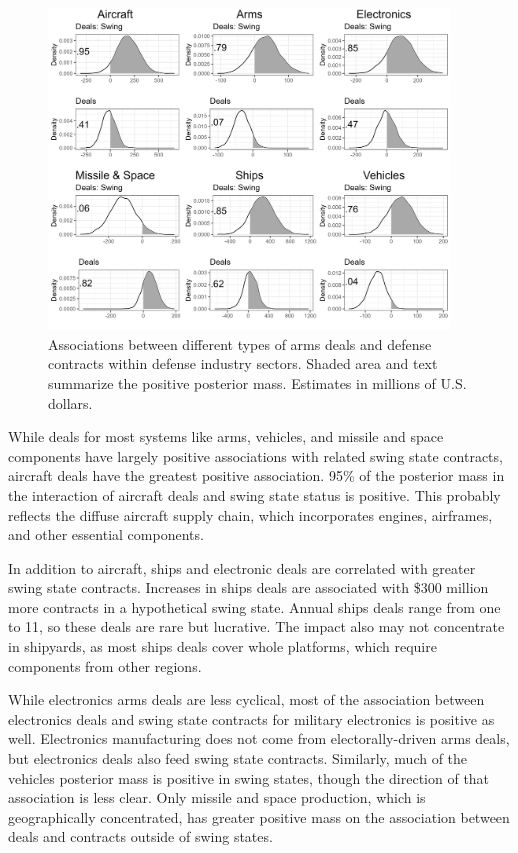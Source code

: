 \documentclass[12pt]{article}
\begin{document}
\begin{figure}[htpb]
	\centering
		\includegraphics[width=0.95\textwidth]{../figures/me-deals-sector.png}
	\caption{Associations between different types of arms deals and defense contracts within defense industry sectors. Shaded area and text summarize the positive posterior mass. Estimates in millions of U.S. dollars.}
	\label{fig:me-deals-sector}
\end{figure}


While deals for most systems like arms, vehicles, and missile and space components have largely positive associations with related swing state contracts, aircraft deals have the greatest positive association. 
95\% of the posterior mass in the interaction of aircraft deals and swing state status is positive.
This probably reflects the diffuse aircraft supply chain, which incorporates engines, airframes, and other essential components. 


In addition to aircraft, ships and electronic deals are correlated with greater swing state contracts. 
Increases in ships deals are associated with \$300 million more contracts in a hypothetical swing state. 
Annual ships deals range from one to 11, so these deals are rare but lucrative. 
The impact also may not concentrate in shipyards, as most ships deals cover whole platforms, which require components from other regions. 

 
While electronics arms deals are less cyclical, most of the association between electronics deals and swing state contracts for military electronics is positive as well.
Electronics manufacturing does not come from electorally-driven arms deals, but electronics deals also feed swing state contracts. 
Similarly, much of the vehicles posterior mass is positive in swing states, though the direction of that association is less clear. 
Only missile and space production, which is geographically concentrated, has greater positive mass on the association between deals and contracts outside of swing states.
\end{document}
